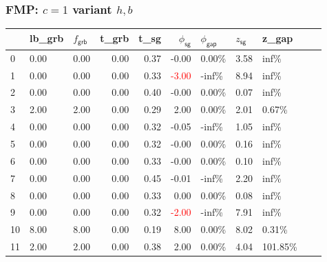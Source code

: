 \begin{frame}
  \frametitle{FMP: \(c = 1\) variant \(h, b\)}
  \scriptsize
  \begin{tabular}{lllrrrlllll}
    \toprule
    {} & lb\_grb              & \(f_{\textsf{grb}}\)   & t\_grb
       & t\_sg                & \(\phi_{\textsf{sg}}\) & \(\phi_{\textsf{gap}}\)
       & \( z_{\textsf{sg}}\) & z\_gap                                                                                                       \\
    \midrule
    0  & 0.00                 & 0.00                   & 0.00                    & 0.37 & -0.00                  & 0.00\% & 3.58  & inf\%    \\
    1  & 0.00                 & 0.00                   & 0.00                    & 0.33 & \textcolor{red}{-3.00} & -inf\% & 8.94  & inf\%    \\
    2  & 0.00                 & 0.00                   & 0.00                    & 0.40 & -0.00                  & 0.00\% & 0.07  & inf\%    \\
    3  & 2.00                 & 2.00                   & 0.00                    & 0.29 & 2.00                   & 0.00\% & 2.01  & 0.67\%   \\
    4  & 0.00                 & 0.00                   & 0.00                    & 0.32 & -0.05                  & -inf\% & 1.05  & inf\%    \\
    5  & 0.00                 & 0.00                   & 0.00                    & 0.32 & -0.00                  & 0.00\% & 0.16  & inf\%    \\
    6  & 0.00                 & 0.00                   & 0.00                    & 0.33 & -0.00                  & 0.00\% & 0.10  & inf\%    \\
    7  & 0.00                 & 0.00                   & 0.00                    & 0.45 & -0.01                  & -inf\% & 2.20  & inf\%    \\
    8  & 0.00                 & 0.00                   & 0.00                    & 0.33 & 0.00                   & 0.00\% & 0.08  & inf\%    \\
    9  & 0.00                 & 0.00                   & 0.00                    & 0.32 & \textcolor{red}{-2.00} & -inf\% & 7.91  & inf\%    \\
    10 & 8.00                 & 8.00                   & 0.00                    & 0.19 & 8.00                   & 0.00\% & 8.02  & 0.31\%   \\
    11 & 2.00                 & 2.00                   & 0.00                    & 0.38 & 2.00                   & 0.00\% & 4.04  & 101.85\% \\

\end{tabular}
\end{frame}
